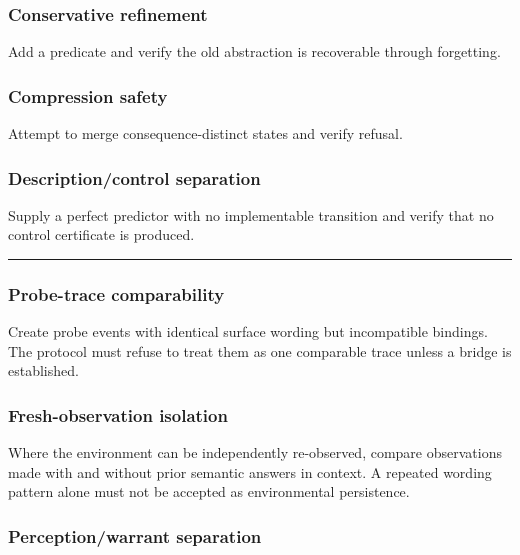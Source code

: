 \documentclass[
]{article}
\begin{document}
\subsubsection{Conservative refinement}\label{conservative-refinement}

Add a predicate and verify the old abstraction is recoverable through
forgetting.

\subsubsection{Compression safety}\label{compression-safety}

Attempt to merge consequence-distinct states and verify refusal.

\subsubsection{Description/control
separation}\label{descriptioncontrol-separation}

Supply a perfect predictor with no implementable transition and verify
that no control certificate is produced.

\begin{center}\rule{0.5\linewidth}{0.5pt}\end{center}


\subsubsection{Probe-trace comparability}\label{probe-trace-comparability-test}

Create probe events with identical surface wording but incompatible bindings.
The protocol must refuse to treat them as one comparable trace unless a bridge
is established.

\subsubsection{Fresh-observation isolation}\label{fresh-observation-isolation-test}

Where the environment can be independently re-observed, compare observations
made with and without prior semantic answers in context. A repeated wording
pattern alone must not be accepted as environmental persistence.

\subsubsection{Perception/warrant separation}\label{perception-warrant-separation-test}
\end{document}
